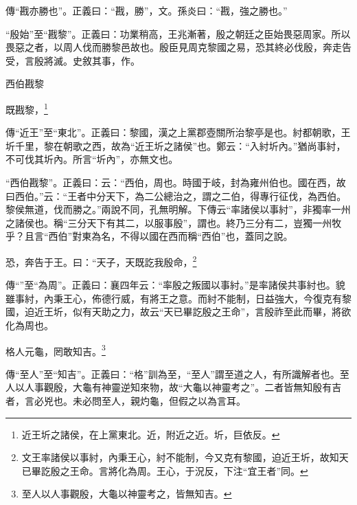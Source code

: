 {\noindent\zhuan{}\fzbyks 傳“戡亦勝也”。正義曰：“戡，勝”，文。孫炎曰：“戡，強之勝也。” \par}

{\noindent\shu{}\fzkt “殷始”至“戡黎”。正義曰：功業稍高，王兆漸著，殷之朝廷之臣始畏惡周家。所以畏惡之者，以周人伐而勝黎邑故也。殷臣見周克黎國之易，恐其終必伐殷，奔走告受，言殷將滅。史敘其事，作。 \par}

西伯戡黎

既戡黎，\footnote{近王圻之諸侯，在上黨東北。近，附近之近。圻，巨依反。}


{\noindent\zhuan{}\fzbyks 傳“近王”至“東北”。正義曰：黎國，漢之上黨郡壺關所治黎亭是也。紂都朝歌，王圻千里，黎在朝歌之西，故為“近王圻之諸侯”也。鄭云：“入紂圻內。”猶尚事紂，不可伐其圻內。所言“圻內”，亦無文也。 \par}

{\noindent\shu{}\fzkt “西伯戡黎”。正義曰：云：“西伯，周也。時國于岐，封為雍州伯也。國在西，故曰西伯。”云：“王者中分天下，為二公總治之，謂之二伯，得專行征伐，為西伯。黎侯無道，伐而勝之。”兩說不同，孔無明解。下傳云“率諸侯以事紂”，非獨率一州之諸侯也。稱“三分天下有其二，以服事殷”，謂也。終乃三分有二，豈獨一州牧乎？且言“西伯”對東為名，不得以國在西而稱“西伯”也，蓋同之說。 \par}

恐，奔告于王。曰：“天子，天既訖我殷命，\footnote{文王率諸侯以事紂，內秉王心，紂不能制，今又克有黎國，迫近王圻，故知天已畢訖殷之王命。言將化為周。王心，于況反，下注“宜王者”同。}

{\noindent\zhuan{}\fzbyks 傳“”至“為周”。正義曰：襄四年云：“率殷之叛國以事紂。”是率諸侯共事紂也。貌雖事紂，內秉王心，佈德行威，有將王之意。而紂不能制，日益強大，今復克有黎國，迫近王圻，似有天助之力，故云“天已畢訖殷之王命”，言殷祚至此而畢，將欲化為周也。 \par}

格人元龜，罔敢知吉。\footnote{至人以人事觀殷，大龜以神靈考之，皆無知吉。}

{\noindent\zhuan{}\fzbyks 傳“至人”至“知吉”。正義曰：“格”訓為至，“至人”謂至道之人，有所識解者也。至人以人事觀殷，大龜有神靈逆知來物，故“大龜以神靈考之”。二者皆無知殷有吉者，言必兇也。未必問至人，親灼龜，但假之以為言耳。 \par}

